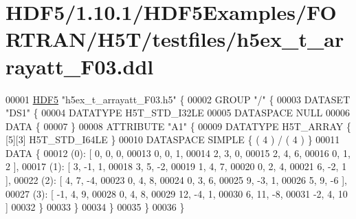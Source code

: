 \hypertarget{_h_d_f5_21_810_81_2_h_d_f5_examples_2_f_o_r_t_r_a_n_2_h5_t_2testfiles_2h5ex__t__arrayatt___f03_8ddl_source}{}\section{H\+D\+F5/1.10.1/\+H\+D\+F5\+Examples/\+F\+O\+R\+T\+R\+A\+N/\+H5\+T/testfiles/h5ex\+\_\+t\+\_\+arrayatt\+\_\+\+F03.ddl}
\label{_h_d_f5_21_810_81_2_h_d_f5_examples_2_f_o_r_t_r_a_n_2_h5_t_2testfiles_2h5ex__t__arrayatt___f03_8ddl_source}

\begin{DoxyCode}
00001 \hyperlink{namespace_h_d_f5}{HDF5} \textcolor{stringliteral}{"h5ex\_t\_arrayatt\_F03.h5"} \{
00002 GROUP \textcolor{stringliteral}{"/"} \{
00003    DATASET \textcolor{stringliteral}{"DS1"} \{
00004       DATATYPE  H5T\_STD\_I32LE
00005       DATASPACE  NULL
00006       DATA \{
00007       \}
00008       ATTRIBUTE \textcolor{stringliteral}{"A1"} \{
00009          DATATYPE  H5T\_ARRAY \{ [5][3] H5T\_STD\_I64LE \}
00010          DATASPACE  SIMPLE \{ ( 4 ) / ( 4 ) \}
00011          DATA \{
00012          (0): [ 0, 0, 0,
00013                0, 0, 1,
00014                2, 3, 0,
00015                2, 4, 6,
00016                0, 1, 2 ],
00017          (1): [ 3, -1, 1,
00018                3, 5, -2,
00019                1, 4, 7,
00020                0, 2, 4,
00021                6, -2, 1 ],
00022          (2): [ 4, 7, -4,
00023                0, 4, 8,
00024                0, 3, 6,
00025                9, -3, 1,
00026                5, 9, -6 ],
00027          (3): [ -1, 4, 9,
00028                0, 4, 8,
00029                12, -4, 1,
00030                6, 11, -8,
00031                -2, 4, 10 ]
00032          \}
00033       \}
00034    \}
00035 \}
00036 \}
\end{DoxyCode}
